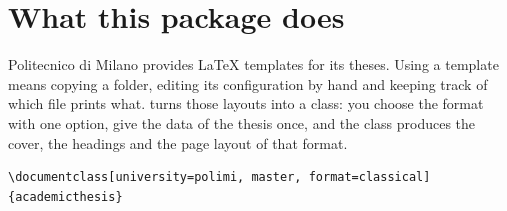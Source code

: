 \documentclass[11pt,a4paper,oneside]{report}
\begin{document}

{\setlength{\parskip}{0pt}\tableofcontents}


\chapter{What this package does}

Politecnico di Milano provides \LaTeX{} templates for its theses. Using a
template means copying a folder, editing its configuration by hand and
keeping track of which file prints what.  turns those
layouts into a class: you choose the format with one option, give the data
of the thesis once, and the class produces the cover, the headings and the
page layout of that format.

\begin{lstlisting}
\documentclass[university=polimi, master, format=classical]{academicthesis}
\end{lstlisting}
\end{document}
